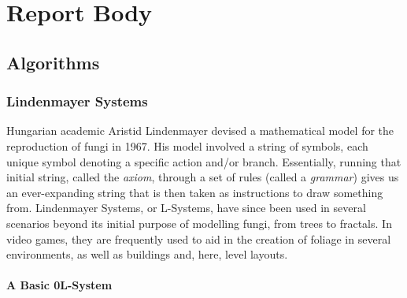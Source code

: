 \chapter{Report Body}

\section{Algorithms}

\subsection{Lindenmayer Systems}

Hungarian academic Aristid Lindenmayer devised a mathematical model for the reproduction of fungi in 1967.\cite{LINDENMAYER1968300} His model involved a string of symbols, each unique symbol denoting a specific action and/or branch. Essentially, running that initial string, called the \emph{axiom}, through a set of rules (called a \emph{grammar}) gives us an ever-expanding string that is then taken as instructions to draw something from. Lindenmayer Systems, or L-Systems, have since been used in several scenarios beyond its initial purpose of modelling fungi, from trees to fractals. In video games, they are frequently used to aid in the creation of foliage in several environments, as well as buildings and, here, level layouts.

\subsubsection{A Basic 0L-System}

